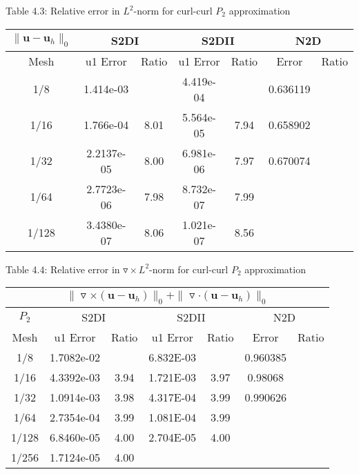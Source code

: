 \documentclass[a4paper,11pt]{article}
\begin{document}
\begin{center}
Table 4.3: {Relative error in $L^2$-norm for curl-curl $P_2$ approximation}
\begin{tabular}{|c|c|c|c|c|c|c|}
  \hline
  \multicolumn{1}{|c}{$\|\mathbf{u} - \mathbf{u}_{h}\|_{0}$} & \multicolumn{2}{|c}{S2DI} & \multicolumn{2}{|c}{S2DII}& \multicolumn{2}{|c|}{N2D} \\
  \hline
    Mesh  & u1 Error & Ratio & u1 Error & Ratio & Error & Ratio  \\
  \hline
    1/8    & 1.414e-03 &	  &  4.419e-04 &	       		  & 0.636119  &       \\
    1/16   & 1.766e-04 & 8.01 &  5.564e-05 &  7.94 			  & 0.658902  &       \\
    1/32   & 2.2137e-05& 8.00 &  6.981e-06 &  7.97 			  & 0.670074  &       \\
    1/64   & 2.7723e-06& 7.98 &  8.732e-07 &  7.99 			  &           &       \\
    1/128  & 3.4380e-07& 8.06 &  1.021e-07 &{\color{red}8.56} &           &       \\
  \hline
\end{tabular}
\end{center}
\begin{center}
Table 4.4: {Relative error in $\triangledown\times L^2$-norm for curl-curl $P_2$ approximation}
\begin{tabular}{|c|c|c|c|c|c|c|}
  \hline
  \multicolumn{7}{|c|}{$\|\triangledown\times(\mathbf{u} - \mathbf{u}_h)\|_0 + \|\triangledown\cdot(\mathbf{u} - \mathbf{u}_h)\|_0$}  \\
  \hline
  \multicolumn{1}{|c}{$P_2$} & \multicolumn{2}{|c}{S2DI} & \multicolumn{2}{|c}{S2DII}& \multicolumn{2}{|c|}{N2D}   \\
  \hline
    Mesh  & u1 Error & Ratio & u1 Error & Ratio & Error & Ratio  \\
  \hline
    1/8   &  1.7082e-02 &       & 6.832E-03 &	   &  0.960385  &       \\
    1/16  &  4.3392e-03 &  3.94 & 1.721E-03 & 3.97 &  0.98068   &       \\
    1/32  &  1.0914e-03 &  3.98 & 4.317E-04 & 3.99 &  0.990626  &       \\
    1/64  &  2.7354e-04 &  3.99 & 1.081E-04 & 3.99 &            &       \\
    1/128 &  6.8460e-05 &  4.00 & 2.704E-05 & 4.00 &            &       \\
    1/256 &  1.7124e-05 &  4.00 &           &      &            &       \\
  \hline
\end{tabular}
\end{center}
\end{document}
